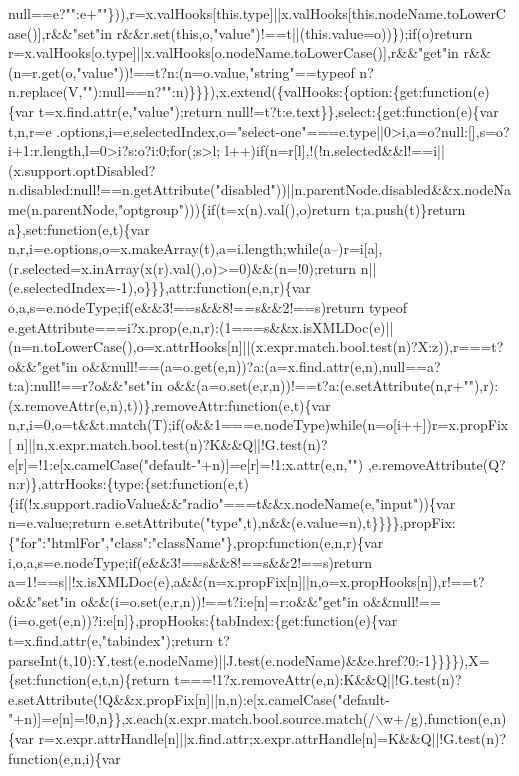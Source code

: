 \begin{DoxyCode}
{       null==e?"":e+""\})),r=x.valHooks[this.type]||x.valHooks[this.nodeName.toLowerCase()],r&&"set"in
       r&&r.set(this,o,"value")!==t||(this.value=o))\});if(o)return r=x.valHooks[o.type]||x.valHooks[o.nodeName.toLowerCase()],r&&"get"in
       r&&(n=r.get(o,"value"))!==t?n:(n=o.value,"string"==typeof
       n?n.replace(V,""):null==n?"":n)\}\}\}),x.extend(\{valHooks:\{option:\{get:function(e)\{var t=x.find.attr(e,"value");return null!=t?t:e.text\}\},select:\{get:function(e)\{var
       t,n,r=e
      .options,i=e.selectedIndex,o="select-one"===e.type||0>i,a=o?null:[],s=o?i+1:r.length,l=0>i?s:o?i:0;for(;s>l;
      l++)if(n=r[l],!(!n.selected&&l!==i||(x.support.optDisabled?n.disabled:null!==n.getAttribute("disabled"))||n.parentNode.disabled&&x.nodeName(n.parentNode,"optgroup")))\{if(t=x(n).val(),o)return t;a.push(t)\}return
       a\},set:function(e,t)\{var
       n,r,i=e.options,o=x.makeArray(t),a=i.length;while(a--)r=i[a],(r.selected=x.inArray(x(r).val(),o)>=0)&&(n=!0);return n||(e.selectedIndex=-1),o\}\}\},attr:function(e,n,r)\{var
       o,a,s=e.nodeType;if(e&&3!==s&&8!==s&&2!==s)return typeof
       e.getAttribute===i?x.prop(e,n,r):(1===s&&x.isXMLDoc(e)||(n=n.toLowerCase(),o=x.attrHooks[n]||(x.expr.match.bool.test(n)?X:z)),r===t?o&&"get"in
       o&&null!==(a=o.get(e,n))?a:(a=x.find.attr(e,n),null==a?t:a):null!==r?o&&"set"in
       o&&(a=o.set(e,r,n))!==t?a:(e.setAttribute(n,r+""),r):(x.removeAttr(e,n),t))\},removeAttr:function(e,t)\{var
       n,r,i=0,o=t&&t.match(T);if(o&&1===e.nodeType)while(n=o[i++])r=x.propFix[
      n]||n,x.expr.match.bool.test(n)?K&&Q||!G.test(n)?e[r]=!1:e[x.camelCase("default-"+n)]=e[r]=!1:x.attr(e,n,"")
      ,e.removeAttribute(Q?n:r)\},attrHooks:\{type:\{set:function(e,t)\{if(!x.support.radioValue&&"radio"===t&&x.nodeName(e,"input"))\{var n=e.value;return
       e.setAttribute("type",t),n&&(e.value=n),t\}\}\}\},propFix:\{"for":"htmlFor","class":"className"\},prop:function(e,n,r)\{var i,o,a,s=e.nodeType;if(e&&3!==s&&8!==s&&2!==s)return
       a=1!==s||!x.isXMLDoc(e),a&&(n=x.propFix[n]||n,o=x.propHooks[n]),r!==t?o&&"set"in
       o&&(i=o.set(e,r,n))!==t?i:e[n]=r:o&&"get"in o&&null!==(i=o.get(e,n))?i:e[n]\},propHooks:\{tabIndex:\{get:function(e)\{var
       t=x.find.attr(e,"tabindex");return
       t?parseInt(t,10):Y.test(e.nodeName)||J.test(e.nodeName)&&e.href?0:-1\}\}\}\}),X=\{set:function(e,t,n)\{return
       t===!1?x.removeAttr(e,n):K&&Q||!G.test(n)?e.setAttribute(!Q&&x.propFix[n]||n,n):e[x.camelCase("default-"+n)]=e[n]=!0,n\}\},x.each(x.expr.match.bool.source.match(/\(\backslash\)w+/g),function(e,n)\{var
       r=x.expr.attrHandle[n]||x.find.attr;x.expr.attrHandle[n]=K&&Q||!G.test(n)?function(e,n,i)\{var
}
\end{DoxyCode}
